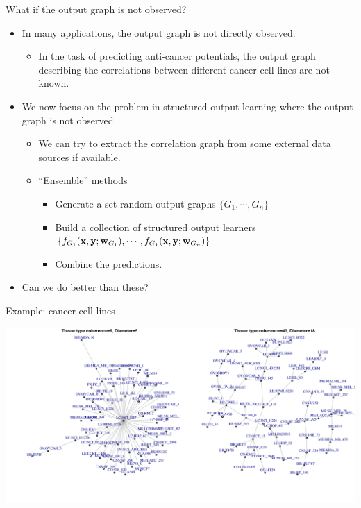 \documentclass[first=dgreen,second=purple,logo=yellowexc]{aaltoslides}
\begin{document}
{\begin{frame}{What if the output graph is not observed?}
	\begin{itemize}
		\item In many applications, the output graph is not directly observed.
		\begin{itemize}
			\footnotesize
			\item In the task of predicting anti-cancer potentials, the output graph describing the correlations between different cancer cell lines are not known.
		\end{itemize}
		\item We now focus on the problem in structured output learning where the output graph is not observed.
		\begin{itemize}
			\footnotesize
			\item We can try to extract the correlation graph from some external data sources if available.
			\item ``Ensemble'' methods
			\begin{itemize}
				\footnotesize
				\item Generate a set random output graphs $\{G_1,\cdots,G_n\}$
				\item Build a collection of structured output learners $\{f_{G_1}(\mathbf {x},\mathbf {y};\mathbf {w}_{G_1}),\cdots,f_{G_1}(\mathbf {x},\mathbf {y};\mathbf {w}_{G_n})\}$
				\item Combine the predictions.
			\end{itemize}
		\end{itemize}
		\item Can we do better than these?
	\end{itemize}
\end{frame}

\begin{frame}{Example: cancer cell lines}
	\begin{center}
		\includegraphics[scale=0.4]{./figures/cancernet.pdf}
	\end{center}
\end{frame}



}
\end{document}
